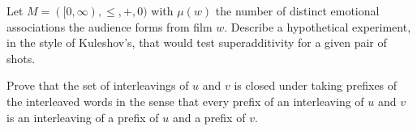 \begin{exercise}
Let $M=([0,\infty),\le,+,0)$ with $\mu(w)$ the number of distinct emotional associations the audience forms from film $w$. Describe a hypothetical experiment, in the style of Kuleshov's, that would test superadditivity for a given pair of shots.
\end{exercise}

\begin{exercise}
Prove that the set of interleavings of $u$ and $v$ is closed under taking prefixes of the interleaved words in the sense that every prefix of an interleaving of $u$ and $v$ is an interleaving of a prefix of $u$ and a prefix of $v$.
\end{exercise}
